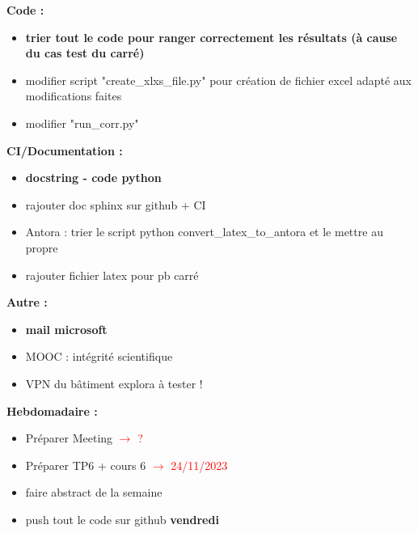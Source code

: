 \textbf{Code :}
\begin{itemize}[label=$\square$] 
	\item \textbf{trier tout le code pour ranger correctement les résultats (à cause du cas test du carré)}
	\item modifier script "create\_xlxs\_file.py" pour création de fichier excel adapté aux modifications faites
	\item modifier "run\_corr.py"
\end{itemize}
\textbf{CI/Documentation :}
\begin{itemize}[label=$\square$] 
	\item \textbf{docstring - code python}
	\item rajouter doc sphinx sur github + CI
	\item Antora : trier le script python convert\_latex\_to\_antora et le mettre au propre
	\item rajouter fichier latex pour pb carré
\end{itemize}
\textbf{Autre :}
\begin{itemize}[label=$\square$] 
	\item \textbf{mail microsoft}
	\item MOOC : intégrité scientifique
	\item VPN du bâtiment explora à tester !
\end{itemize}
\textbf{Hebdomadaire :}
\begin{itemize}[label=$\square$] 
	\item[\wontfix] Préparer Meeting \textcolor{red}{$\rightarrow$ ?}
	\item[\done] Préparer TP6 + cours 6 \textcolor{red}{$\rightarrow$ 24/11/2023}
	\item faire abstract de la semaine 
	\item push tout le code sur github \textbf{vendredi}
\end{itemize}